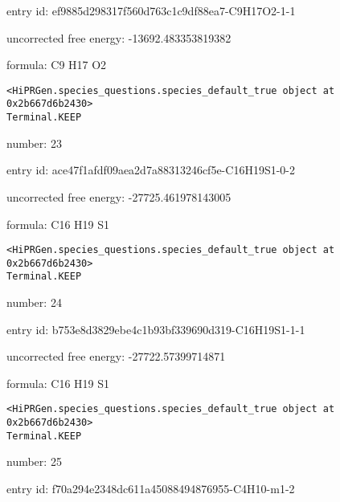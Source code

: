 \documentclass{article}
\begin{document}
entry id: ef9885d298317f560d763c1c9df88ea7-C9H17O2-1-1



uncorrected free energy: -13692.483353819382



formula: C9 H17 O2


\vspace{1cm}
\begin{verbatim}
<HiPRGen.species_questions.species_default_true object at 0x2b667d6b2430>
Terminal.KEEP
\end{verbatim}


number: 23



entry id: ace47f1afdf09aea2d7a88313246cf5e-C16H19S1-0-2



uncorrected free energy: -27725.461978143005



formula: C16 H19 S1


\vspace{1cm}
\begin{verbatim}
<HiPRGen.species_questions.species_default_true object at 0x2b667d6b2430>
Terminal.KEEP
\end{verbatim}


number: 24



entry id: b753e8d3829ebe4c1b93bf339690d319-C16H19S1-1-1



uncorrected free energy: -27722.57399714871



formula: C16 H19 S1


\vspace{1cm}
\begin{verbatim}
<HiPRGen.species_questions.species_default_true object at 0x2b667d6b2430>
Terminal.KEEP
\end{verbatim}


number: 25



entry id: f70a294e2348dc611a45088494876955-C4H10-m1-2
\end{document}

